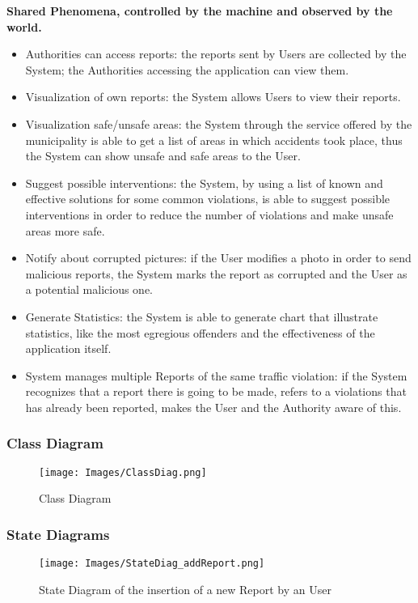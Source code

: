     \noindent\textbf{Shared Phenomena, controlled by the machine and observed by the world.}
      \begin{itemize}
          \item Authorities can access reports: the reports sent by Users are collected by the System; the Authorities accessing the application can view them.
          \item Visualization of own reports: the System allows Users to view their reports.
          \item Visualization safe/unsafe areas: the System through the service offered by the municipality is able to get a list of areas in which accidents took place, thus the System can show unsafe and safe areas to the User.
          \item Suggest possible interventions: the System,  by using a list of known and effective solutions for some common violations, is able to suggest possible interventions in order to reduce the number of violations and make unsafe areas more safe.
          \item Notify about corrupted pictures: if the User modifies a photo in order to send malicious reports, the System marks the report as corrupted and the User as a potential malicious one.
          \item Generate Statistics: the System is able to generate chart that illustrate statistics, like the most egregious offenders and the effectiveness of the application itself.
          \item System manages multiple Reports of the same traffic violation: if the System recognizes that a report there is going to be made, refers to a violations that has already been reported, makes the User and the Authority aware of this.
          \end{itemize}
          

\vspace{40px}      

\subsubsection{Class Diagram}
    \begin{figure}[h]
        \centering
        \texttt{[image: Images/ClassDiag.png]}
        \caption{Class Diagram}
    \end{figure}

\newpage

\subsubsection{State Diagrams}
    \begin{figure}[h]
        \centering
        \texttt{[image: Images/StateDiag\_addReport.png]}
        \caption{State Diagram of the insertion of a new Report by an User}
    \end{figure}
    
